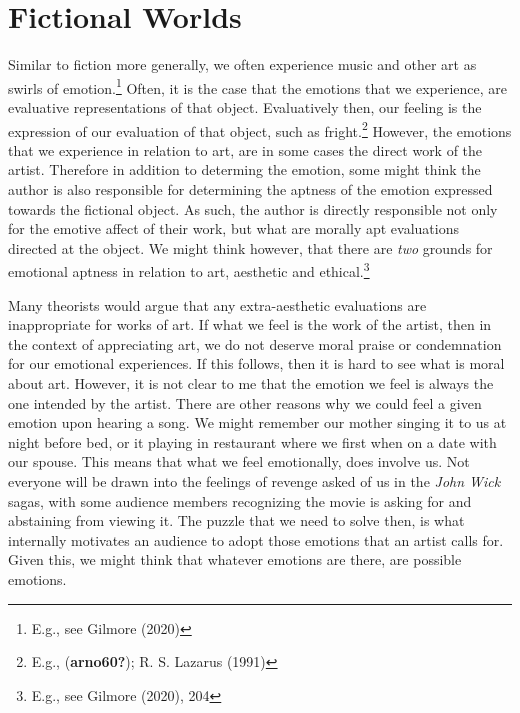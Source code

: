 \documentclass[12pt]{book}
\theoremstyle{definition}
\theoremstyle{remark}
\begin{document}
\section{Fictional Worlds}\label{fictional-worlds}

Similar to fiction more generally, we often experience music and other art as swirls of emotion.\footnote{E.g., see Gilmore (2020)} Often, it is the case that the emotions that we experience, are evaluative representations of that object. Evaluatively then, our feeling is the expression of our evaluation of that object, such as fright.\footnote{E.g., (\textbf{arno60?}); R. S. Lazarus (1991)} However, the emotions that we experience in relation to art, are in some cases the direct work of the artist. Therefore in addition to determing the emotion, some might think the author is also responsible for determining the aptness of the emotion expressed towards the fictional object. As such, the author is directly responsible not only for the emotive affect of their work, but what are morally apt evaluations directed at the object. We might think however, that there are \emph{two} grounds for emotional aptness in relation to art, aesthetic and ethical.\footnote{E.g., see Gilmore (2020), 204}

Many theorists would argue that any extra-aesthetic evaluations are inappropriate for works of art. If what we feel is the work of the artist, then in the context of appreciating art, we do not deserve moral praise or condemnation for our emotional experiences. If this follows, then it is hard to see what is moral about art. However, it is not clear to me that the emotion we feel is always the one intended by the artist. There are other reasons why we could feel a given emotion upon hearing a song. We might remember our mother singing it to us at night before bed, or it playing in restaurant where we first when on a date with our spouse. This means that what we feel emotionally, does involve us. Not everyone will be drawn into the feelings of revenge asked of us in the \emph{John Wick} sagas, with some audience members recognizing the movie is asking for and abstaining from viewing it. The puzzle that we need to solve then, is what internally motivates an audience to adopt those emotions that an artist calls for. Given this, we might think that whatever emotions are there, are possible emotions.
\end{document}
